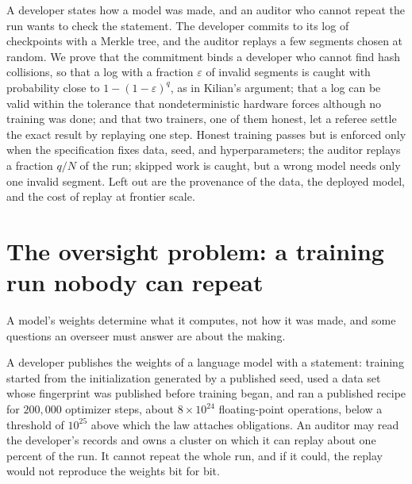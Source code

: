 
\begin{refsection}

\begin{chaptersummary}
A developer states how a model was made, and an auditor who cannot repeat the run wants to check the statement. The developer commits to its log of checkpoints with a Merkle tree, and the auditor replays a few segments chosen at random. We prove that the commitment binds a developer who cannot find hash collisions, so that a log with a fraction $\varepsilon$ of invalid segments is caught with probability close to $1-(1-\varepsilon)^q$, as in Kilian's argument; that a log can be valid within the tolerance that nondeterministic hardware forces although no training was done; and that two trainers, one of them honest, let a referee settle the exact result by replaying one step. Honest training passes but is enforced only when the specification fixes data, seed, and hyperparameters; the auditor replays a fraction $q/N$ of the run; skipped work is caught, but a wrong model needs only one invalid segment. Left out are the provenance of the data, the deployed model, and the cost of replay at frontier scale.
\end{chaptersummary}

\section{The oversight problem: a training run nobody can repeat}\label{sec:training:problem}

A model's weights determine what it computes, not how it was made, and some questions an overseer must answer are about the making.

\begin{oversight}
A developer publishes the weights of a language model with a statement: training started from the initialization generated by a published seed, used a data set whose fingerprint was published before training began, and ran a published recipe for $200{,}000$ optimizer steps, about $8\times10^{24}$ floating-point operations, below a threshold of $10^{25}$ above which the law attaches obligations. An auditor may read the developer's records and owns a cluster on which it can replay about one percent of the run. It cannot repeat the whole run, and if it could, the replay would not reproduce the weights bit for bit.
\end{oversight}


\end{refsection}
